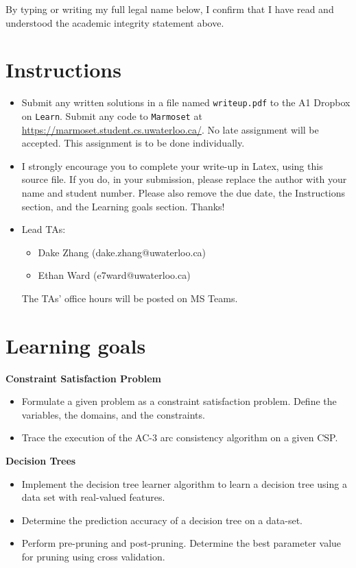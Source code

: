 \documentclass[12pt]{article}
\begin{document}
By typing or writing my full legal name below, I confirm that I have read and understood the academic integrity statement above.


\newpage
\section*{Instructions}

\begin{itemize}
\item
Submit any written solutions in a file named \verb+writeup.pdf+ to the A1 Dropbox on \verb+Learn+. Submit any code to \verb+Marmoset+ at \url{https://marmoset.student.cs.uwaterloo.ca/}. 
No late assignment will be accepted. This assignment is to be done individually.

\item 
I strongly encourage you to complete your write-up in Latex, using this source file. If you do, in your submission, please replace the author with your name and student number. Please also remove the due date, the Instructions section, and the Learning goals section. Thanks!

\item
Lead TAs: 
\begin{itemize}
\item
Dake Zhang (dake.zhang@uwaterloo.ca)
\item 
Ethan Ward (e7ward@uwaterloo.ca)
\end{itemize}
The TAs' office hours will be posted on MS Teams.
\end{itemize}

\section*{Learning goals}
%
{\bf Constraint Satisfaction Problem}
\begin{itemize}
\item
Formulate a given problem as a constraint satisfaction problem. Define the variables, the domains, and the constraints.
\item
Trace the execution of the AC-3 arc consistency algorithm on a given CSP.
\end{itemize}

{\bf Decision Trees}
\begin{itemize}
\item 
Implement the decision tree learner algorithm to learn a decision tree using a data set with real-valued features.
\item
Determine the prediction accuracy of a decision tree on a data-set.
\item
Perform pre-pruning and post-pruning. Determine the best parameter value for pruning using cross validation.
\end{itemize}
\end{document}
